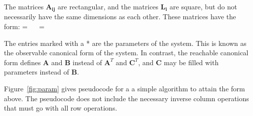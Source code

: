 The matrices $\mathbf{A_{ij}}$ are rectangular, and the matrices
$\mathbf{L_i}$ are square, but do not necessarily have the same
dimensions as each other. These matrices have the form:
\starteqnstar
{} =  ~~
 = 
\doneeqnstar

The entries marked with a * are the parameters of the system.  This is
known as the observable canonical form of the system. In contrast, the
reachable canonical form defines $\mathbf{A}$ and $\mathbf{B}$ instead
of $\mathbf{A}^T$ and $\mathbf{C}^T$, and $\mathbf{C}$ may be filled
with parameters instead of $\mathbf{B}$.

Figure~\ref{fig:param} gives pseudocode for a a simple algorithm to
attain the form above.  The pseudocode does not include the necessary
inverse column operations that must go with all row operations.

\newcommand{\IND}{\begin{ALC@g}}
\newcommand{\UND}{\end{ALC@g}}

